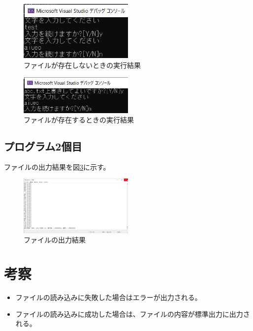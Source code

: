 \documentclass[dvipdfmx]{jsarticle}
\begin{document}
\begin{figure}[ht]
  \centering
  \includegraphics[width=0.5\textwidth]{./img/result_pr1_ndup.png}
  \caption{ファイルが存在しないときの実行結果}
  \label{fig:result_pr1_ndup}
\end{figure}

\begin{figure}[ht]
  \centering
  \includegraphics[width=0.5\textwidth]{./img/result_pr1_dup.png}
  \caption{ファイルが存在するときの実行結果}
  \label{fig:result_pr1_dup}
\end{figure}

\newpage
\subsection{プログラム2個目}
ファイルの出力結果を図\ref{fig:result_pr2}に示す。\\

\begin{figure}[ht]
  \centering
  \includegraphics[width=0.5\textwidth]{./img/result_pr2.png}
  \caption{ファイルの出力結果}
  \label{fig:result_pr2}
\end{figure}





\section{考察}
\begin{itemize}
  \item ファイルの読み込みに失敗した場合はエラーが出力される。
  \item ファイルの読み込みに成功した場合は、ファイルの内容が標準出力に出力される。
\end{itemize}
\end{document}
